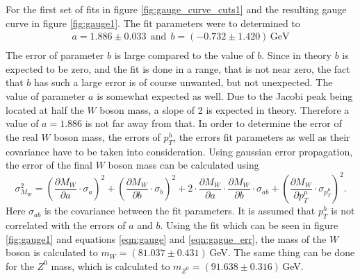     For the first set of fits in figure \ref{fig:gauge_curve_cuts1} and the resulting gauge curve in figure \ref{fig:gauge1}. The fit parameters were to determined to 
    \begin{align*}
        a = 1.886 \pm 0.033 \ \ \mathrm{and} \ \ b = (-0.732 \pm 1.420)\,\mathrm{GeV}  \\
    \end{align*}
    The error of parameter $b$ is large compared to the value of $b$. Since in theory $b$ is expected to be zero, and the fit is done in a range, that is not near zero,
    the fact that $b$ has such a large error is of course unwanted, but not unexpected. The value of parameter $a$ is somewhat expected as well.
    Due to the Jacobi peak being located at half the $W$ boson mass, a slope of 2 is expected in theory. Therefore a value of $a=1.886$ is not far away from that.
    In order to determine the error of the real $W$ boson mass, the errors of $p_T^h$, the errors fit parameters as well as their covariance have to be taken into consideration.
    Using gaussian error propagation, the error of the final $W$ boson mass can be calculated using 
    \begin{equation}
        \label{eqn:gague_err}
        \sigma^2_{M_W} = \left( \frac{\partial M_W}{\partial a} \cdot \sigma_a \right)^2 + \left( \frac{\partial M_W}{\partial b} \cdot \sigma_b \right)^2 
        + 2 \cdot \frac{\partial M_W}{\partial a} \cdot \frac{\partial M_W}{\partial b} \cdot \sigma_{ab} 
        + \left( \frac{\partial M_W}{\partial p_T^{\mu}} \cdot \sigma_{p_T^{\mu}} \right)^2.
    \end{equation}
    Here $\sigma_{ab}$ is the covariance between the fit parameters. It is assumed that $p_T^h$ is not correlated with the errors of $a$ and $b$.
    Using the fit which can be seen in figure \ref{fig:gauge1} and equations \ref{eqn:gauge} and \ref{eqn:gague_err}, the mass of the $W$ boson is calculated
    to $m_W = (81.037 \pm 0.431)$\,GeV.
    The same thing can be done for the $Z^0$ mass, which is calculated to $m_{Z^0} = (91.638 \pm 0.316)$\,GeV.
    

